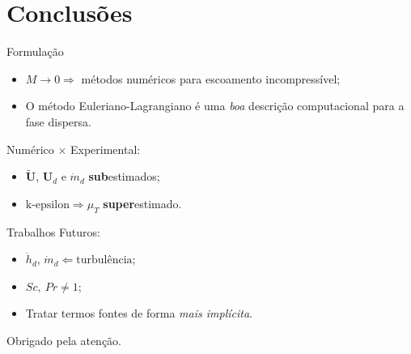 \documentclass[bars,mathserif]{beamer}
\newcommand{\bv}[1]{\mathbf{#1}}
\begin{document}
\section{Conclusões}
\frame{\tableofcontents[currentsection]}

\begin{frame}

\begin{block}{Formulação}
  \begin{itemize}
  \item $M \rightarrow  0 \Longrightarrow$  métodos numéricos para escoamento incompressível;
  \item O método Euleriano-Lagrangiano é uma \textit{boa} descrição computacional para a fase dispersa.
 \end{itemize}
\end{block}


\begin{block}{Numérico $\times$ Experimental:}
 \begin{itemize}
  \item $\bv{\tilde{U}}$, $\bv{U}_d$ e $\dot{m}_d$ \textbf{sub}estimados;
  \item $\text{k-epsilon} \Longrightarrow \mu_T$ \textbf{super}estimado.
 \end{itemize}
\end{block}

\begin{block}{Trabalhos Futuros:}
 \begin{itemize}
  \item $\dot{h}_{d}$, $\dot{m}_d \Longleftarrow \text{turbulência}$;
  \item $Sc,\ Pr \neq 1$;
  \item Tratar termos fontes de forma \textit{mais implícita}.
 \end{itemize}
\end{block}
\end{frame}


\begin{frame}
\centerline{Obrigado pela atenção.}
\end{frame}
\end{document}

